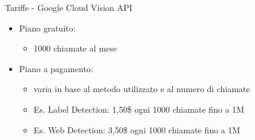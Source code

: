%
\begin{frame}[t]{Tariffe - Google Cloud Vision API}
\begin{itemize}
	\item Piano gratuito:
	\begin{itemize}
		\item 1000 chiamate al mese
	\end{itemize}
	\item Piano a pagamento:
	\begin{itemize}
		\item varia in base al metodo utilizzato e al numero di chiamate
		\item Es. \textsf{Label Detection}: 1,50\$ ogni 1000 chiamate fino a 1M
		\item Es. \textsf{Web Detection}: 3,50\$ ogni 1000 chiamate fino a 1M
	\end{itemize}
\end{itemize}
\end{frame}
%
